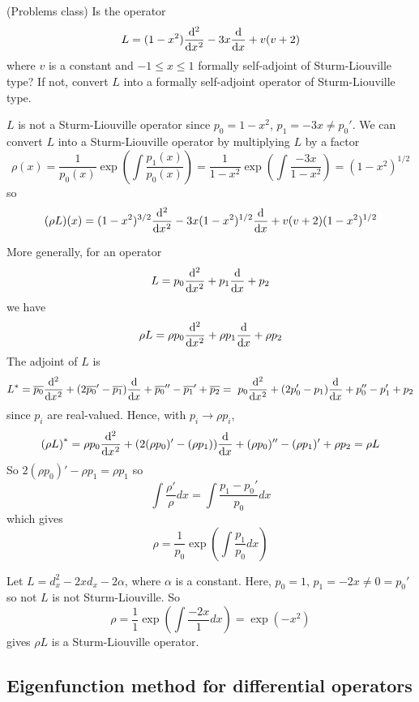 \begin{example}
	(Problems class) Is the operator
	\[
		L = (1 - x^2) \diff[2]{}{x} - 3x \diff{}{x} + v(v + 2)
	\]
	where $v$ is a constant and $-1 \le x \le 1$ formally self-adjoint of Sturm-Liouville type? If not, convert $L$ into a formally self-adjoint operator of Sturm-Liouville type.

	$L$ is not a Sturm-Liouville operator since $p_0 = 1 - x^2$, $p_1 = -3x \ne p_0'$. We can convert $L$ into a Sturm-Liouville operator by multiplying $L$ by a factor
	\[
		\rho(x) = \frac{1}{p_0(x)} \exp \left( \int \frac{p_1(x)}{p_0(x)} \right) = \frac{1}{1 - x^2} \exp \left( \int \frac{-3x}{1 - x^2} \right) = {(1 - x^2)}^{1 / 2}
	\]
	so
	\[
		(\rho L) (x) = (1 - x^2)^{3 / 2} \diff[2]{}{x} - 3x (1 - x^2)^{1 / 2} \diff{}{x} + v(v + 2) (1 - x^2)^{1 / 2}
	\]
\end{example}

\begin{remark}
	More generally, for an operator
	\[
		L = p_0 \diff[2]{}{x} + p_1 \diff{}{x} + p_2
	\]
	we have
	\[
		\rho L = \rho p_0 \diff[2]{}{x} + \rho p_1 \diff{}{x} + \rho p_2
	\]
	The adjoint of $L$ is
	\[
		L^* = \overline{p_0} \diff[2]{}{x} + (2 \overline{p_0}' - \overline{p_1}) \diff{}{x} + \overline{p_0}'' - \overline{p_1}' + \overline{p_2} =  \
		p_0 \diff[2]{}{x} + (2 p_0' - p_1) \diff{}{x} + p_0'' - p_1' + p_2
	\]
	since $p_i$ are real-valued. Hence, with $p_i \rightarrow \rho p_i$,
	\[
		{(\rho L)}^* = \rho p_0 \diff[2]{}{x} + (2 (\rho p_0)' - (\rho p_1)) \diff{}{x} + (\rho p_0)'' - (\rho p_1)' + \rho p_2 = \rho L
	\]
	So $2 (\rho p_0)' - \rho p_1 = \rho p_1$ so
	\[
		\int \frac{\rho'}{\rho} dx = \int \frac{p_1 - p_0'}{p_0} dx
	\]
	which gives
	\[
		\rho = \frac{1}{p_0} \exp \left( \int \frac{p_1}{p_0} dx \right)
	\]
\end{remark}

\begin{example}
	Let $L = d_x^2 - 2x d_x - 2 \alpha$, where $\alpha$ is a constant. Here, $p_0 = 1$, $p_1 = -2x \ne 0 = p_0'$ so not $L$ is not Sturm-Liouville. So
	\[
		\rho = \frac{1}{1} \exp \left( \int \frac{-2x}{1} dx \right) = \exp \left( -x^2 \right)
	\]
	gives $\rho L$ is a Sturm-Liouville operator.
\end{example}

\subsection{Eigenfunction method for differential operators}

